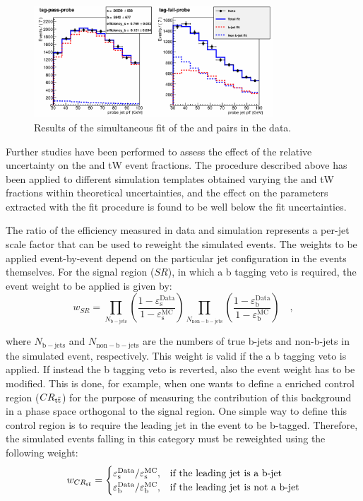 \begin{figure}[htb]
\centering
\includegraphics[width=0.8\textwidth]{images/data_ptprobe-v2.pdf}
\caption{Results of the simultaneous fit of the \tpp and \tfp pairs in the data.\label{fig:data_tp}}
\end{figure}

Further studies have been performed to assess the effect of the relative uncertainty on the \ttbar and tW event fractions. The procedure described above has been applied to different simulation templates obtained varying the \ttbar and tW fractions within theoretical uncertainties, and the effect on the parameters extracted with the fit procedure is found to be well below the fit uncertainties.

The ratio of the efficiency measured in data and simulation represents a per-jet scale factor that can be used to reweight the simulated events. The weights to be applied event-by-event depend on the particular jet configuration in the events themselves. For the signal region ($SR$), in which a b tagging veto is required, the event weight to be applied is given by:
\begin{equation}
w_{SR} = \prod_{N_\mathrm{b-jets}} \left( \frac{1-\varepsilon_\mathrm{s}^\mathrm{Data}}{1-\varepsilon_\mathrm{s}^\mathrm{MC}} \right) \prod_{N_\mathrm{non-b-jets}} \left( \frac{1-\varepsilon_\mathrm{b}^\mathrm{Data}}{1-\varepsilon_\mathrm{b}^\mathrm{MC}} \right) \quad ,
\end{equation}

\noindent where $N_\mathrm{b-jets}$ and $N_\mathrm{non-b-jets}$ are the numbers of true b-jets and non-b-jets in the simulated event, respectively. This weight is valid if the a b tagging veto is applied. If instead the b tagging veto is reverted, also the event weight has to be modified. This is done, for example, when one wants to define a \ttbar enriched control region ($CR_{\mathrm{t}\bar{\mathrm{t}}}$) for the purpose of measuring the contribution of this background in a phase space orthogonal to the signal region. One simple way to define this control region is to require the leading jet in the event to be b-tagged. Therefore, the simulated events falling in this category must be reweighted using the following weight:
\begin{equation}
w_{CR_{\mathrm{t}\bar{\mathrm{t}}}} = 
\begin{cases}
\varepsilon_\mathrm{s}^\mathrm{Data}/\varepsilon_\mathrm{s}^\mathrm{MC},& \text{if the leading jet is a b-jet} \\
\varepsilon_\mathrm{b}^\mathrm{Data}/\varepsilon_\mathrm{b}^\mathrm{MC},& \text{if the leading jet is not a b-jet} 
\end{cases}
\end{equation}





